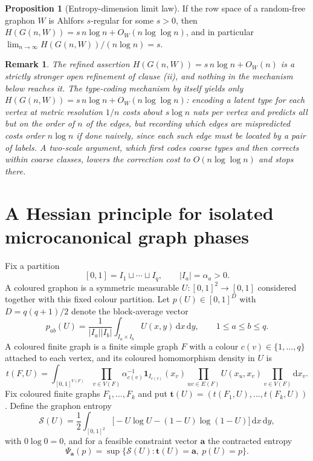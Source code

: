 \documentclass[11pt]{article}
\newtheorem{remark}{Remark}
\theoremstyle{definition}
\newtheorem{proposition}{Proposition}
\begin{document}
\begin{proposition}[Entropy-dimension limit law]\label{t3:limit}
If the row space of a random-free graphon $W$ is Ahlfors $s$-regular
for some $s>0$, then $H(G(n,W))=s\,n\log n+O_W(n\log\log n)$, and in
particular $\lim_{n\to\infty}H(G(n,W))/(n\log n)=s$.
\end{proposition}

\begin{remark}\label{t3:refined}
The refined assertion $H(G(n,W))=s\,n\log n+O_W(n)$ is a strictly
stronger open refinement of clause (ii), and nothing in the mechanism
below reaches it.  The type-coding mechanism by itself yields only
$H(G(n,W))=s\,n\log n+O_W(n\log\log n)$: encoding a latent type for
each vertex at metric resolution $1/n$ costs about $s\log n$ nats per
vertex and predicts all but on the order of $n$ of the edges, but
recording which edges are mispredicted costs order $n\log n$ if done
naively, since each such edge must be located by a pair of labels.  A
two-scale argument, which first codes coarse types and then corrects
within coarse classes, lowers the correction cost to
$O(n\log\log n)$ and stops there.
\end{remark}


\section{A Hessian principle for isolated microcanonical graph phases}

Fix a partition
\[
[0,1]=I_1\sqcup\cdots\sqcup I_q,
\qquad|I_a|=\alpha_a>0 .
\]
A coloured graphon is a symmetric measurable $U:[0,1]^2\to[0,1]$
considered together with this fixed colour partition.  Let
$p(U)\in[0,1]^D$ with $D=q(q+1)/2$ denote the block-average vector
\[
p_{ab}(U)=\frac1{|I_a||I_b|}\int_{I_a\times I_b}U(x,y)\,\mathrm
dx\,\mathrm dy,
\qquad 1\le a\le b\le q .
\]
A coloured finite graph is a finite simple graph $F$ with a colour
$c(v)\in\{1,\ldots,q\}$ attached to each vertex, and its coloured
homomorphism density in $U$ is
\[
t(F,U)=\int_{[0,1]^{V(F)}}
\prod_{v\in V(F)}\alpha_{c(v)}^{-1}\mathbf 1_{I_{c(v)}}(x_v)
\prod_{uv\in E(F)}U(x_u,x_v)
\prod_{v\in V(F)}\mathrm dx_v .
\]
Fix coloured finite graphs $F_1,\ldots,F_k$ and put
$\mathbf t(U)=(t(F_1,U),\ldots,t(F_k,U))$.  Define the graphon entropy
\[
\mathcal S(U)=\frac12\int_{[0,1]^2}
\bigl[-U\log U-(1-U)\log(1-U)\bigr]\,\mathrm dx\,\mathrm dy,
\]
with $0\log0=0$, and for a feasible constraint vector $\mathbf a$ the
contracted entropy
\[
\Psi_{\mathbf a}(p)=\sup\{\mathcal S(U):
\mathbf t(U)=\mathbf a,\ p(U)=p\}.
\]
\end{document}
